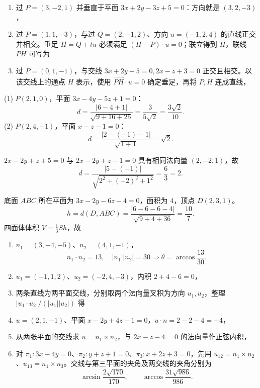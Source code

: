 \begin{enumerate}[label=(\arabic*)]
\item 过 $P=(3,-2,1)$ 并垂直于平面 $3x+2y-3z+5=0$：方向就是 $(3,2,-3)$，
\item 过 $P=(1,1,-3)$，与过 $Q=(2,-1,2)$、方向 $u=(-1,2,4)$ 的直线正交并相交。垂足 $H=Q+tu$ 必须满足 $(H-P)\cdot u=0$；联立得到 $H$，联线 $PH$ 可写为
\item 过 $P=(0,1,-1)$，与交线 $3x+2y-5=0,2x-z+3=0$ 正交且相交。以该交线上的通点 $H$ 表示，使用 $\overrightarrow{PH}\cdot u=0$ 确定垂足，再将 $P,H$ 连成直线，
\end{enumerate}

(1) $P(2,1,0)$，平面 $3x-4y-5z+1=0$：
\[d=\frac{|6-4+1|}{\sqrt{9+16+25}}=\frac{3}{5\sqrt2}=\frac{3\sqrt2}{10}.\]
(2) $P(2,4,-1)$，平面 $x-z-1=0$：
\[d=\frac{|2-(-1)-1|}{\sqrt{1+1}}=\sqrt2.\]

$2x-2y+z+5=0$ 与 $2x-2y+z-1=0$ 具有相同法向量 $(2,-2,1)$，故
\[d=\frac{|5-(-1)|}{\sqrt{2^2+(-2)^2+1^2}}=\frac63=2.\]

底面 $ABC$ 所在平面为 $3x-2y-6z-4=0$，面积为 $4$，顶点 $D(2,3,1)$。
\[h=d(D,ABC)=\frac{|6-6-6-4|}{\sqrt{9+4+36}}=\frac{10}{7}.\]
四面体体积 $V=\frac13Sh$，故

\begin{enumerate}[label=(\arabic*)]
\item $n_1=(3,-4,-5)$、$n_2=(4,1,-1)$，
\[n_1\cdot n_2=13,\quad |n_1||n_2|=30\Rightarrow\theta=\arccos\frac{13}{30}.\]
\item $u_1=(-1,1,2)$、$u_2=(-2,4,-3)$，内积 $2+4-6=0$，
\item 两条直线为两平面交线，分别取两个法向量叉积为方向 $u_1,u_2$，整理 $|u_1\cdot u_2|/(|u_1||u_2|)$ 得
\item $u=(2,1,-1)$、平面 $x-2y+4z-1=0$，$u\cdot n=2-2-4=-4$，
\item 从两张平面的交线求 $u=n_1\times n_2$，与 $2x-z-4=0$ 的法向量作正弦内积，
\item 对 $\pi_1:3x-4y=0$、$\pi_2:y+z+1=0$、$\pi_3:x+2z+3=0$，先用 $u_{12}=n_1\times n_2$、$u_{13}=n_1\times n_3$。交线与第三平面的夹角及两交线的夹角分别为
\[
\arcsin\frac{2\sqrt{170}}{170},\qquad
\arccos\frac{31\sqrt{986}}{986}.
\]
\end{enumerate}

